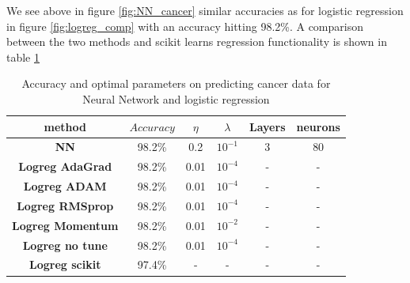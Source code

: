 \documentclass[11pt]{article}
\begin{document}
We see above in figure \ref{fig:NN_cancer} similar accuracies as for logistic regression in figure \ref{fig:logreg_comp} with an accuracy hitting 98.2\%. A comparison between the two methods and scikit learns regression functionality is shown in table \ref{tab:cancer_comp}
\begin{table}[H]
  \centering
  \caption{Accuracy and optimal parameters on predicting cancer data for Neural Network and logistic regression}
  \label{tab:cancer_comp}
  \begin{tabular}{|c|c|c|c|c|c|}
    \hline
    method                   & $Accuracy$ & $\eta$ & $\lambda$ & Layers & neurons \\
    \hline
    \textbf{NN}              & 98.2\%     & 0.2    & $10^{-1}$ & 3      & 80      \\\hline
    \textbf{Logreg AdaGrad}  & 98.2\%     & 0.01   & $10^{-4}$ & -      & -       \\\hline
    \textbf{Logreg ADAM}     & 98.2\%     & 0.01   & $10^{-4}$ & -      & -       \\\hline
    \textbf{Logreg RMSprop}  & 98.2\%     & 0.01   & $10^{-4}$ & -      & -       \\\hline
    \textbf{Logreg Momentum} & 98.2\%     & 0.01   & $10^{-2}$ & -      & -       \\\hline
    \textbf{Logreg no tune}  & 98.2\%     & 0.01   & $10^{-4}$ & -      & -       \\\hline
    \textbf{Logreg scikit}   & 97.4\%     & -      & -         & -      & -       \\\hline
  \end{tabular}
\end{table}
\end{document}
